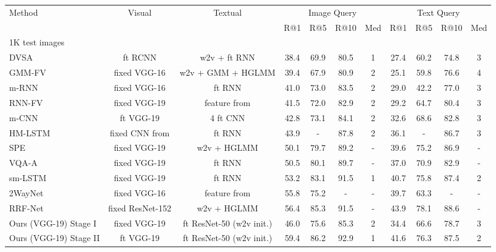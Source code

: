 \documentclass[10pt,final,journal]{IEEEtran}
\begin{document}
\setlength{\tabcolsep}{5pt}
\begin{table*}
\footnotesize
\begin{center}
\begin{tabular}{l|c|c|cccc|cccc}
\hline
\multirow{2}{*}{Method} & \multirow{2}{*}{Visual} & \multirow{2}{*}{Textual} &\multicolumn{4}{c|}{Image Query} & \multicolumn{4}{c}{Text Query}\\
  & &  & R@1 & R@5 & R@10 & Med & R@1 & R@5 & R@10 & Med \\
\shline
1K test images\\
\shline
DVSA \cite{karpathy2015deep} & ft RCNN & w2v + ft RNN& 38.4 & 69.9 & 80.5 & 1 & 27.4 & 60.2 & 74.8 & 3 \\
GMM-FV \cite{klein2015associating} & fixed VGG-16 & w2v + GMM + HGLMM& 39.4 & 67.9 & 80.9 & 2 & 25.1 & 59.8 & 76.6 & 4\\
m-RNN \cite{mao2014deep}  & fixed VGG-16 & ft RNN & 41.0 & 73.0 & 83.5 & 2 & 29.0 & 42.2 & 77.0 & 3 \\
RNN-FV \cite{lev2016rnn}  & fixed VGG-19 & feature from \cite{klein2015associating} & 41.5 & 72.0 & 82.9 & 2 & 29.2 & 64.7 & 80.4 & 3 \\
m-CNN \cite{ma2015multimodal}  & ft VGG-19 & 4  ft CNN& 42.8 & 73.1 & 84.1 & 2 & 32.6 & 68.6 & 82.8 & 3\\
HM-LSTM \cite{niu2017hierarchical}  & fixed CNN from \cite{karpathy2015deep}& ft RNN& 43.9 & - & 87.8 & 2 & 36.1 & - & 86.7 & 3 \\
SPE \cite{wang2016learning}  & fixed VGG-19 & w2v + HGLMM& 50.1 & 79.7 & 89.2 & - & 39.6 & 75.2 & 86.9 & - \\
VQA-A \cite{lin2016leveraging} & fixed VGG-19 & ft RNN & 50.5 & 80.1 & 89.7 & - & 37.0 & 70.9 & 82.9 & - \\
sm-LSTM \cite{huang2016instance} & fixed VGG-19 & ft RNN & 53.2 & 83.1 & 91.5 & 1 & 40.7 & 75.8 & 87.4 & 2\\
2WayNet \cite{eisenschtat2016linking} &  fixed VGG-16 & feature from \cite{klein2015associating} & 55.8 & 75.2 & - & - & 39.7 & 63.3 & - & - \\
RRF-Net \cite{liu2017learning} & fixed ResNet-152 & w2v + HGLMM & 56.4 & 85.3 & 91.5 & - & 43.9 & 78.1 & 88.6 & - \\
\hline
Ours (VGG-19) Stage I & fixed VGG-19 & ft ResNet-50 (w2v init.)& 46.0 & 75.6 & 85.3 & 2 & 34.4 & 66.6 & 78.7 & 3 \\
Ours (VGG-19) Stage II & ft VGG-19 & ft ResNet-50 (w2v init.)& 59.4 & 86.2 & 92.9 & 1 & 41.6 & 76.3 & 87.5 & 2 \\

\end{tabular}
\end{center}
\end{table*}
\end{document}
